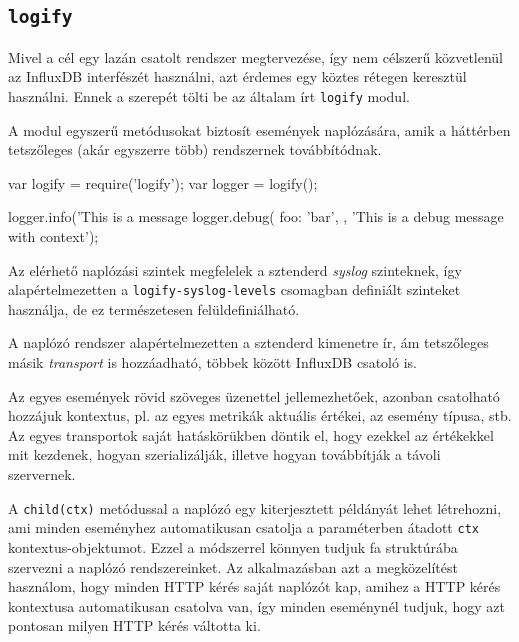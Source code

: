 \subsection{\texttt{logify}}

Mivel a cél egy lazán csatolt rendszer megtervezése, így nem célszerű
közvetlenül az InfluxDB interfészét használni, azt érdemes egy köztes rétegen
keresztül használni. Ennek a szerepét tölti be az általam írt \texttt{logify}
modul.\cite{Logify}

A modul egyszerű metódusokat biztosít események naplózására, amik a háttérben
tetszőleges (akár egyszerre több) rendszernek továbbítódnak.

\begin{js}
var logify = require('logify');
var logger = logify();

logger.info('This is a message %
logger.debug({
  foo: 'bar',
}, 'This is a debug message with context');
\end{js}

Az elérhető naplózási szintek megfelelek a sztenderd \emph{syslog} szinteknek,
így alapértelmezetten a \verb=logify-syslog-levels= csomagban definiált
szinteket használja, de ez természetesen felüldefiniálható.

A naplózó rendszer alapértelmezetten a sztenderd kimenetre ír, ám tetszőleges
másik \emph{transport} is hozzáadható, többek között InfluxDB csatoló is.

Az egyes események rövid szöveges üzenettel jellemezhetőek, azonban csatolható
hozzájuk kontextus, pl. az egyes metrikák aktuális értékei, az esemény típusa,
stb. Az egyes transportok saját hatáskörükben döntik el, hogy ezekkel az
értékekkel mit kezdenek, hogyan szerializálják, illetve hogyan továbbítják
a távoli szervernek.

A \verb=child(ctx)= metódussal a naplózó egy kiterjesztett példányát lehet
létrehozni, ami minden eseményhez automatikusan csatolja a paraméterben
átadott \verb=ctx= kontextus-objektumot. Ezzel a módszerrel könnyen tudjuk
fa struktúrába szervezni a naplózó rendszereinket.
Az alkalmazásban azt a megközelítést használom, hogy minden HTTP kérés
saját naplózót kap, amihez a HTTP kérés kontextusa automatikusan csatolva
van, így minden eseménynél tudjuk, hogy azt pontosan milyen HTTP kérés
váltotta ki.
